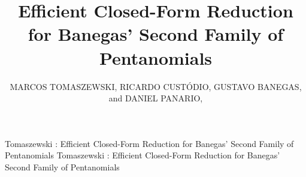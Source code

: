 \documentclass{ieeeaccess}
\theoremstyle{plain}
\theoremstyle{definition}
\begin{document}

\title{Efficient Closed-Form Reduction for Banegas' Second Family of Pentanomials}

\author{\uppercase{Marcos Tomaszewski},
\uppercase{Ricardo Custódio},
\uppercase{Gustavo Banegas},
and \uppercase{Daniel Panario},
}

\address[1]{Laboratório de Segurança em Computação (LabSEC), Departamento de Informática e
Estatística, Universidade Federal de Santa Catarina, Florianópolis, SC, Brazil}
\address[2]{ECLAIR Team, Inria Saclay, CNRS, and LIX, École Polytechnique, Institut Polytechnique de Paris,
Palaiseau, France}
\address[3]{School of Mathematics and Statistics, Carleton University, Ottawa, ON, Canada}


\markboth
{Tomaszewski \headeretal: Efficient Closed-Form Reduction for Banegas' Second Family of Pentanomials}
{Tomaszewski \headeretal: Efficient Closed-Form Reduction for Banegas' Second Family of Pentanomials}

\end{document}
